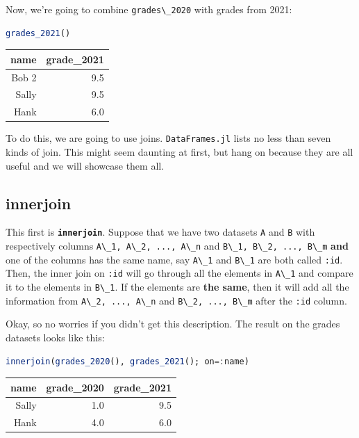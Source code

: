 \documentclass[
  notoc %
]{tufte-book}
\newcommand{\passthrough}[1]{#1}
\begin{document}
Now, we're going to combine \passthrough{\lstinline!grades\_2020!} with
grades from 2021:

\begin{lstlisting}[language=Julia]
grades_2021()
\end{lstlisting}

\begin{longtable}[]{@{}rr@{}}
\toprule
name & grade\_2021 \\
\midrule
\endhead
Bob 2 & 9.5 \\
Sally & 9.5 \\
Hank & 6.0 \\
\bottomrule
\end{longtable}

To do this, we are going to use joins.
\passthrough{\lstinline!DataFrames.jl!} lists no less than seven kinds
of join. This might seem daunting at first, but hang on because they are
all useful and we will showcase them all.

\hypertarget{sec:innerjoin}{%
\subsection{innerjoin}\label{sec:innerjoin}}

This first is \textbf{\passthrough{\lstinline!innerjoin!}}. Suppose that
we have two datasets \passthrough{\lstinline!A!} and
\passthrough{\lstinline!B!} with respectively columns
\passthrough{\lstinline!A\_1, A\_2, ..., A\_n!} and
\passthrough{\lstinline!B\_1, B\_2, ..., B\_m!} \textbf{and} one of the
columns has the same name, say \passthrough{\lstinline!A\_1!} and
\passthrough{\lstinline!B\_1!} are both called
\passthrough{\lstinline!:id!}. Then, the inner join on
\passthrough{\lstinline!:id!} will go through all the elements in
\passthrough{\lstinline!A\_1!} and compare it to the elements in
\passthrough{\lstinline!B\_1!}. If the elements are \textbf{the same},
then it will add all the information from
\passthrough{\lstinline!A\_2, ..., A\_n!} and
\passthrough{\lstinline!B\_2, ..., B\_m!} after the
\passthrough{\lstinline!:id!} column.

Okay, so no worries if you didn't get this description. The result on
the grades datasets looks like this:

\begin{lstlisting}[language=Julia]
innerjoin(grades_2020(), grades_2021(); on=:name)
\end{lstlisting}

\begin{longtable}[]{@{}rrr@{}}
\toprule
name & grade\_2020 & grade\_2021 \\
\midrule
\endhead
Sally & 1.0 & 9.5 \\
Hank & 4.0 & 6.0 \\
\bottomrule
\end{longtable}
\end{document}
